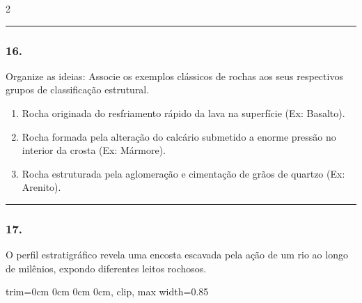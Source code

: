 \documentclass[twoside, 10pt, a4paper]{article}
\newlength{\espacoPreQuestao}
\newlength{\espacoQuestao}
\newlength{\espacoAlt}
\newcommand{\larguraTikz}{0.85\linewidth} %
\begin{document}
\begin{multicols*}{2}
\noindent\textcolor{CorLinha}{\rule{\linewidth}{0.5pt}} 
\par\vspace{\espacoPreQuestao}
\subsubsection*{16.} Organize as ideias: Associe os exemplos clássicos de rochas aos seus respectivos grupos de classificação estrutural.

\begin{enumerate}[label=\Roman*., itemsep=\espacoAlt]
\item Rocha originada do resfriamento rápido da lava na superfície (Ex: Basalto).
\item Rocha formada pela alteração do calcário submetido a enorme pressão no interior da crosta (Ex: Mármore).
\item Rocha estruturada pela aglomeração e cimentação de grãos de quartzo (Ex: Arenito).
\end{enumerate}
\par\vspace{\espacoQuestao}

\noindent\textcolor{CorLinha}{\rule{\linewidth}{0.5pt}} 
\par\vspace{\espacoPreQuestao}
\subsubsection*{17.} O perfil estratigráfico revela uma encosta escavada pela ação de um rio ao longo de milênios, expondo diferentes leitos rochosos.

\begin{center}
\begin{adjustbox}{trim=0cm 0cm 0cm 0cm, clip, max width=\larguraTikz}
\end{adjustbox}
\end{center}
\end{multicols*}
\end{document}
